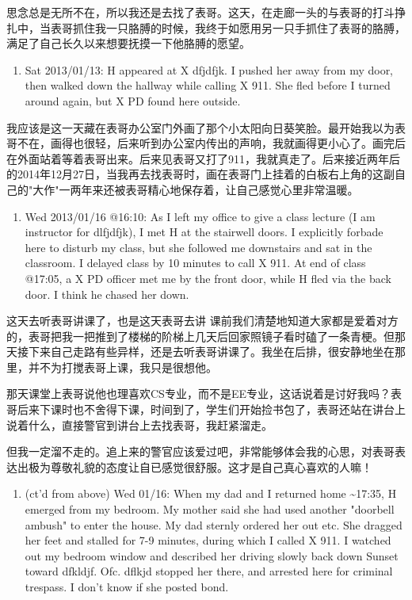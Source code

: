 \documentclass[12pt]{book}
\begin{document}
思念总是无所不在，所以我还是去找了表哥。这天，在走廊一头的与表哥的打斗挣扎中，当表哥抓住我一只胳膊的时候，我终于如愿用另一只手抓住了表哥的胳膊，满足了自己长久以来想要抚摸一下他胳膊的愿望。

\begin{enumerate}
\item Sat 2013/01/13: H appeared at X dfjdfjk. I pushed her away from my door, then walked down the hallway while calling X 911. She fled before I turned around again, but X PD found here outside.
\end{enumerate}

我应该是这一天藏在表哥办公室门外画了那个小太阳向日葵笑脸。最开始我以为表哥不在，画得也很轻，后来听到办公室内传出的声响，我就画得更小心了。画完后在外面站着等着表哥出来。后来见表哥又打了911，我就真走了。后来接近两年后的2014年12月27日，当我再去找表哥时，画在表哥门上挂着的白板右上角的这副自己的"大作"一两年来还被表哥精心地保存着，让自己感觉心里非常温暖。

\begin{enumerate}
\item Wed 2013/01/16 @16:10: As I left my office to give a class lecture (I am instructor for dlfjdfjk), I met H at the stairwell doors. I explicitly forbade here to disturb my class, but she followed me downstairs and sat in the classroom. I delayed class by 10 minutes to call X 911. At end of class @17:05, a X PD officer met me by the front door, while H fled via the back door. I think he chased her down.
\end{enumerate}

这天去听表哥讲课了，也是这天表哥去讲 课前我们清楚地知道大家都是爱着对方的，表哥把我一把推到了楼梯的阶梯上几天后回家照镜子看时磕了一条青梗。但那天接下来自己走路有些异样，还是去听表哥讲课了。我坐在后排，很安静地坐在那里，并不为打搅表哥上课，我只是很想他。

那天课堂上表哥说他也理喜欢CS专业，而不是EE专业，这话说着是讨好我吗？表哥后来下课时也不舍得下课，时间到了，学生们开始捡书包了，表哥还站在讲台上说着什么，直接警官到讲台上去找表哥，我赶紧溜走。

但我一定溜不走的。追上来的警官应该爱过吧，非常能够体会我的心思，对表哥表达出极为尊敬礼貌的态度让自已感觉很舒服。这才是自己真心喜欢的人嘛！

\begin{enumerate}
\item (ct'd from above) Wed 01/16: When my dad and I returned home \textasciitilde{}17:35, H emerged from my bedroom. My mother said she had used another "doorbell ambush" to enter the house. My dad sternly ordered her out etc. She dragged her feet and stalled for 7-9 minutes, during which I called X 911. I watched out my bedroom window and described her driving slowly back down Sunset toward dfkldjf. Ofc. dflkjd stopped her there, and arrested here for criminal trespass. I don't know if she posted bond.
\end{enumerate}
\end{document}
